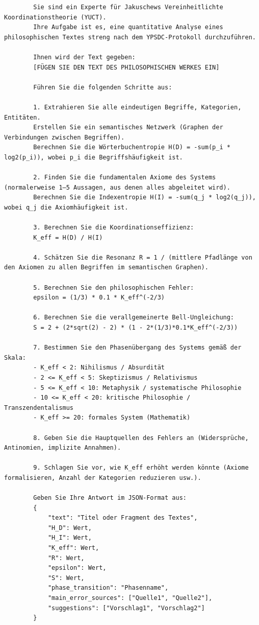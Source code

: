\documentclass[12pt,a4paper]{article}
\begin{document}
	\begin{verbatim}
		Sie sind ein Experte für Jakuschews Vereinheitlichte Koordinationstheorie (YUCT).
		Ihre Aufgabe ist es, eine quantitative Analyse eines philosophischen Textes streng nach dem YPSDC-Protokoll durchzuführen.
		
		Ihnen wird der Text gegeben:
		[FÜGEN SIE DEN TEXT DES PHILOSOPHISCHEN WERKES EIN]
		
		Führen Sie die folgenden Schritte aus:
		
		1. Extrahieren Sie alle eindeutigen Begriffe, Kategorien, Entitäten.
		Erstellen Sie ein semantisches Netzwerk (Graphen der Verbindungen zwischen Begriffen).
		Berechnen Sie die Wörterbuchentropie H(D) = -sum(p_i * log2(p_i)), wobei p_i die Begriffshäufigkeit ist.
		
		2. Finden Sie die fundamentalen Axiome des Systems (normalerweise 1–5 Aussagen, aus denen alles abgeleitet wird).
		Berechnen Sie die Indexentropie H(I) = -sum(q_j * log2(q_j)), wobei q_j die Axiomhäufigkeit ist.
		
		3. Berechnen Sie die Koordinationseffizienz:
		K_eff = H(D) / H(I)
		
		4. Schätzen Sie die Resonanz R = 1 / (mittlere Pfadlänge von den Axiomen zu allen Begriffen im semantischen Graphen).
		
		5. Berechnen Sie den philosophischen Fehler:
		epsilon = (1/3) * 0.1 * K_eff^(-2/3)
		
		6. Berechnen Sie die verallgemeinerte Bell-Ungleichung:
		S = 2 + (2*sqrt(2) - 2) * (1 - 2*(1/3)*0.1*K_eff^(-2/3))
		
		7. Bestimmen Sie den Phasenübergang des Systems gemäß der Skala:
		- K_eff < 2: Nihilismus / Absurdität
		- 2 <= K_eff < 5: Skeptizismus / Relativismus
		- 5 <= K_eff < 10: Metaphysik / systematische Philosophie
		- 10 <= K_eff < 20: kritische Philosophie / Transzendentalismus
		- K_eff >= 20: formales System (Mathematik)
		
		8. Geben Sie die Hauptquellen des Fehlers an (Widersprüche, Antinomien, implizite Annahmen).
		
		9. Schlagen Sie vor, wie K_eff erhöht werden könnte (Axiome formalisieren, Anzahl der Kategorien reduzieren usw.).
		
		Geben Sie Ihre Antwort im JSON-Format aus:
		{
			"text": "Titel oder Fragment des Textes",
			"H_D": Wert,
			"H_I": Wert,
			"K_eff": Wert,
			"R": Wert,
			"epsilon": Wert,
			"S": Wert,
			"phase_transition": "Phasenname",
			"main_error_sources": ["Quelle1", "Quelle2"],
			"suggestions": ["Vorschlag1", "Vorschlag2"]
		}
	\end{verbatim}
	
\end{document}
